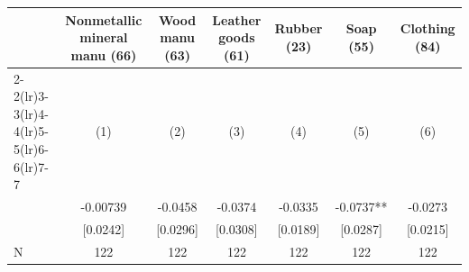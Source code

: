 {
\def\sym#1{\ifmmode^{#1}\else\(^{#1}\)\fi}
\begin{tabular}{l*{6}{c}}
\toprule
            &\multicolumn{1}{c}{Nonmetallic mineral manu (66)}&\multicolumn{1}{c}{Wood manu (63)}&\multicolumn{1}{c}{Leather goods (61)}&\multicolumn{1}{c}{Rubber (23)}&\multicolumn{1}{c}{Soap (55)}&\multicolumn{1}{c}{Clothing (84)}\\\cmidrule(lr){2-2}\cmidrule(lr){3-3}\cmidrule(lr){4-4}\cmidrule(lr){5-5}\cmidrule(lr){6-6}\cmidrule(lr){7-7}
            &\multicolumn{1}{c}{(1)}   &\multicolumn{1}{c}{(2)}   &\multicolumn{1}{c}{(3)}   &\multicolumn{1}{c}{(4)}   &\multicolumn{1}{c}{(5)}   &\multicolumn{1}{c}{(6)}   \\
\midrule
{}          &    -0.00739   &     -0.0458   &     -0.0374   &     -0.0335   &     -0.0737** &     -0.0273   \\
            &    [0.0242]   &    [0.0296]   &    [0.0308]   &    [0.0189]   &    [0.0287]   &    [0.0215]   \\
\midrule
N           &         122   &         122   &         122   &         122   &         122   &         122   \\
\bottomrule
\end{tabular}
}
